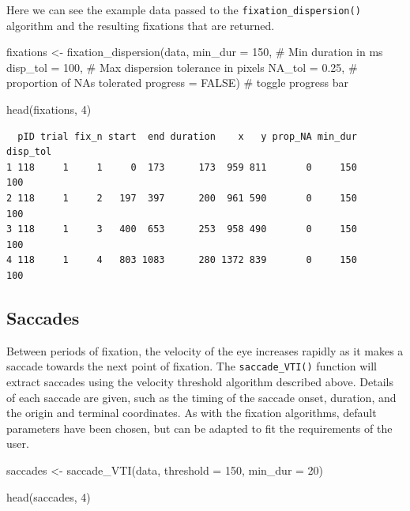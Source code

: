\documentclass[
  man,
  floatsintext,
  longtable,
  nolmodern,
  notxfonts,
  notimes,
  colorlinks=true,linkcolor=blue,citecolor=blue,urlcolor=blue]{apa7}
\newenvironment{Shaded}{\begin{snugshade}}{\end{snugshade}}
\newcommand{\AttributeTok}[1]{\textcolor[rgb]{0.40,0.45,0.13}{#1}}
\newcommand{\CommentTok}[1]{\textcolor[rgb]{0.37,0.37,0.37}{#1}}
\newcommand{\ConstantTok}[1]{\textcolor[rgb]{0.56,0.35,0.01}{#1}}
\newcommand{\DecValTok}[1]{\textcolor[rgb]{0.68,0.00,0.00}{#1}}
\newcommand{\FloatTok}[1]{\textcolor[rgb]{0.68,0.00,0.00}{#1}}
\newcommand{\FunctionTok}[1]{\textcolor[rgb]{0.28,0.35,0.67}{#1}}
\newcommand{\NormalTok}[1]{\textcolor[rgb]{0.00,0.23,0.31}{#1}}
\newcommand{\OtherTok}[1]{\textcolor[rgb]{0.00,0.23,0.31}{#1}}
\begin{document}
Here we can see the example data passed to the
\texttt{fixation\_dispersion()} algorithm and the resulting fixations
that are returned.

\begin{Shaded}
\begin{Highlighting}[]
\NormalTok{fixations }\OtherTok{\textless{}{-}} 
  \FunctionTok{fixation\_dispersion}\NormalTok{(data,}
                      \AttributeTok{min\_dur =} \DecValTok{150}\NormalTok{, }\CommentTok{\# Min duration in ms}
                      \AttributeTok{disp\_tol =} \DecValTok{100}\NormalTok{, }\CommentTok{\# Max dispersion tolerance in pixels}
                      \AttributeTok{NA\_tol =} \FloatTok{0.25}\NormalTok{, }\CommentTok{\# proportion of NAs tolerated }
                      \AttributeTok{progress =} \ConstantTok{FALSE}\NormalTok{) }\CommentTok{\# toggle progress bar}
                   

\FunctionTok{head}\NormalTok{(fixations, }\DecValTok{4}\NormalTok{)}
\end{Highlighting}
\end{Shaded}

\begin{verbatim}
  pID trial fix_n start  end duration    x   y prop_NA min_dur disp_tol
1 118     1     1     0  173      173  959 811       0     150      100
2 118     1     2   197  397      200  961 590       0     150      100
3 118     1     3   400  653      253  958 490       0     150      100
4 118     1     4   803 1083      280 1372 839       0     150      100
\end{verbatim}

\subsection{Saccades}\label{saccades}

Between periods of fixation, the velocity of the eye increases rapidly
as it makes a saccade towards the next point of fixation. The
\texttt{saccade\_VTI()} function will extract saccades using the
velocity threshold algorithm described above. Details of each saccade
are given, such as the timing of the saccade onset, duration, and the
origin and terminal coordinates. As with the fixation algorithms,
default parameters have been chosen, but can be adapted to fit the
requirements of the user.

\begin{Shaded}
\begin{Highlighting}[]
\NormalTok{saccades }\OtherTok{\textless{}{-}} \FunctionTok{saccade\_VTI}\NormalTok{(data,}
                        \AttributeTok{threshold =} \DecValTok{150}\NormalTok{,}
                        \AttributeTok{min\_dur =} \DecValTok{20}\NormalTok{)}

\FunctionTok{head}\NormalTok{(saccades, }\DecValTok{4}\NormalTok{)}
\end{Highlighting}
\end{Shaded}
\end{document}
